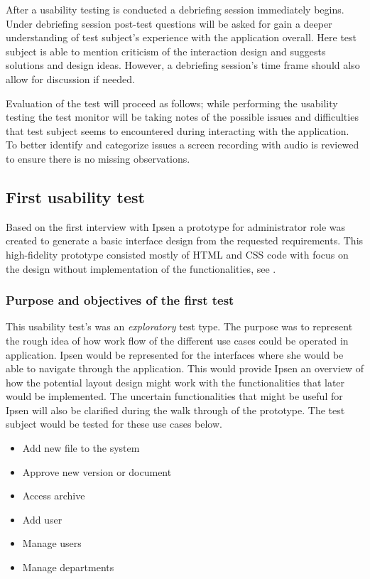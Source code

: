 After a usability testing is conducted a debriefing session immediately  begins.
Under debriefing session post-test questions will be asked for gain a deeper understanding of test subject's experience with the application overall.
Here test subject is able to mention criticism of the interaction design and suggests solutions and design ideas.
However, a debriefing session's time frame should also allow for discussion if needed.

Evaluation of the test will proceed as follows; while performing the usability testing the test monitor will be taking notes of the possible issues and difficulties that test subject seems to encountered during interacting with the application.
To better identify and categorize issues a screen recording with audio is reviewed to ensure there is no missing observations.

\subsection{First usability test}\label{firsttest}
Based on the first interview with Ipsen a prototype for administrator role was created to generate a basic interface design from the requested requirements.
This high-fidelity prototype consisted mostly of HTML and CSS code with focus on the design without implementation of the functionalities, see .

\subsubsection*{Purpose and objectives of the first test}
This usability test's was an \textit{exploratory} test type.
The purpose was to represent the rough idea of how work flow of the different use cases could be operated in application.
Ipsen would be represented for the interfaces where she would be able to navigate through the application.
This would provide Ipsen an overview of how the potential layout design might work with the functionalities that later would be implemented.
The uncertain functionalities that might be useful for Ipsen will also be clarified during the walk through of the prototype.
The test subject would be tested for these use cases below.

\begin{itemize}
	\item Add new file to the system
	\item Approve new version or document
	\item Access archive
	\item Add user
	\item Manage users
	\item Manage departments
\end{itemize}

